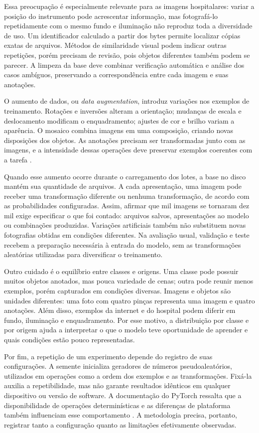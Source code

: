 Essa preocupação é especialmente relevante para as imagens hospitalares: variar a posição do instrumento pode acrescentar informação, mas fotografá-lo repetidamente com o mesmo fundo e iluminação não reproduz toda a diversidade de uso. Um identificador calculado a partir dos bytes permite localizar cópias exatas de arquivos. Métodos de similaridade visual podem indicar outras repetições, porém precisam de revisão, pois objetos diferentes também podem se parecer. A limpeza da base deve combinar verificação automática e análise dos casos ambíguos, preservando a correspondência entre cada imagem e suas anotações.

O aumento de dados, ou \textit{data augmentation}, introduz variações nos exemplos de treinamento. Rotações e inversões alteram a orientação; mudanças de escala e deslocamento modificam o enquadramento; ajustes de cor e brilho variam a aparência. O mosaico combina imagens em uma composição, criando novas disposições dos objetos. As anotações precisam ser transformadas junto com as imagens, e a intensidade dessas operações deve preservar exemplos coerentes com a tarefa \parencite{ultralyticsAugmentation}.

Quando esse aumento ocorre durante o carregamento dos lotes, a base no disco mantém sua quantidade de arquivos. A cada apresentação, uma imagem pode receber uma transformação diferente ou nenhuma transformação, de acordo com as probabilidades configuradas. Assim, afirmar que mil imagens se tornaram dez mil exige especificar o que foi contado: arquivos salvos, apresentações ao modelo ou combinações produzidas. Variações artificiais também não substituem novas fotografias obtidas em condições diferentes. Na avaliação usual, validação e teste recebem a preparação necessária à entrada do modelo, sem as transformações aleatórias utilizadas para diversificar o treinamento.

Outro cuidado é o equilíbrio entre classes e origens. Uma classe pode possuir muitos objetos anotados, mas pouca variedade de cenas; outra pode reunir menos exemplos, porém capturados em condições diversas. Imagens e objetos são unidades diferentes: uma foto com quatro pinças representa uma imagem e quatro anotações. Além disso, exemplos da internet e do hospital podem diferir em fundo, iluminação e enquadramento. Por esse motivo, a distribuição por classe e por origem ajuda a interpretar o que o modelo teve oportunidade de aprender e quais condições estão pouco representadas.

Por fim, a repetição de um experimento depende do registro de suas configurações. A semente inicializa geradores de números pseudoaleatórios, utilizados em operações como a ordem dos exemplos e as transformações. Fixá-la auxilia a repetibilidade, mas não garante resultados idênticos em qualquer dispositivo ou versão de software. A documentação do PyTorch ressalta que a disponibilidade de operações determinísticas e as diferenças de plataforma também influenciam esse comportamento \parencite{pytorchReprodutibilidade}. A metodologia precisa, portanto, registrar tanto a configuração quanto as limitações efetivamente observadas.

